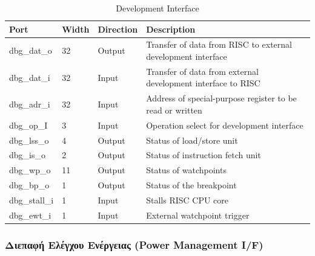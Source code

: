 \documentclass[a4paper,10pt]{article}
\numberwithin{figure}{section}
\numberwithin{table}{section}
\begin{document}
{%
\vspace{0.7cm}
\renewcommand{\arraystretch}{1.2}
\setlength{\tabcolsep}{0.3em}
\newcommand{\mc}[3]{\multicolumn{#1}{#2}{#3}}
\begin{table}[h]
\begin{center}
\begin{tabular}{|l|l|l|l|}
\hline
\rowcolor{tcA}
Port & Width & Direction & Description\\\hline
dbg\_dat\_o & 32 & Output & Transfer of data from RISC to external development interface\\\hline
dbg\_dat\_i & 32 & Input & Transfer of data from external development interface to RISC\\\hline
dbg\_adr\_i & 32 & Input & Address of special-purpose register to be read or written\\\hline
dbg\_op\_I & 3 & Input & Operation select for development interface\\\hline
dbg\_lss\_o & 4 & Output & Status of load/store unit\\\hline
dbg\_is\_o & 2 & Output & Status of instruction fetch unit\\\hline
dbg\_wp\_o & 11 & Output & Status of watchpoints\\\hline
dbg\_bp\_o & 1 & Output & Status of the breakpoint\\\hline
dbg\_stall\_i & 1 & Input & Stalls RISC CPU core\\\hline
dbg\_ewt\_i & 1 & Input & External watchpoint trigger\\\hline
\end{tabular}
\end{center}
\caption{Development Interface}
\end{table}
\vspace{0.7cm}
}%

\subsubsection{Διεπαφή Ελέγχου Ενέργειας (Power Management I/F)}
\end{document}
